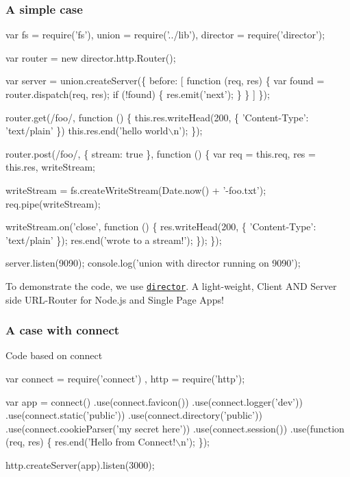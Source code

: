 \subsubsection*{A simple case}


\begin{DoxyCode}
var fs = require('fs'),
    union = require('../lib'),
    director = require('director');

var router = new director.http.Router();

var server = union.createServer(\{
  before: [
    function (req, res) \{
      var found = router.dispatch(req, res);
      if (!found) \{
        res.emit('next');
      \}
    \}
  ]
\});

router.get(/foo/, function () \{
  this.res.writeHead(200, \{ 'Content-Type': 'text/plain' \})
  this.res.end('hello world\(\backslash\)n');
\});

router.post(/foo/, \{ stream: true \}, function () \{
  var req = this.req,
      res = this.res,
      writeStream;

  writeStream = fs.createWriteStream(Date.now() + '-foo.txt');
  req.pipe(writeStream);

  writeStream.on('close', function () \{
    res.writeHead(200, \{ 'Content-Type': 'text/plain' \});
    res.end('wrote to a stream!');
  \});
\});

server.listen(9090);
console.log('union with director running on 9090');
\end{DoxyCode}


To demonstrate the code, we use \href{https://github.com/flatiron/director}{\tt director}. A light-\/weight, Client A\+ND Server side U\+R\+L-\/\+Router for Node.\+js and Single Page Apps!

\subsubsection*{A case with connect}

Code based on connect


\begin{DoxyCode}
var connect = require('connect')
  , http = require('http');

var app = connect()
  .use(connect.favicon())
  .use(connect.logger('dev'))
  .use(connect.static('public'))
  .use(connect.directory('public'))
  .use(connect.cookieParser('my secret here'))
  .use(connect.session())
  .use(function (req, res) \{
    res.end('Hello from Connect!\(\backslash\)n');
  \});

http.createServer(app).listen(3000);
\end{DoxyCode}


